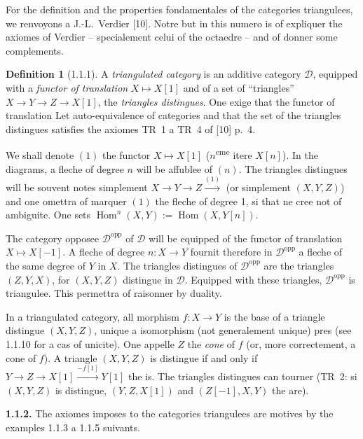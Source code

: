 \documentclass[12pt,a4paper]{article}
\theoremstyle{plain}
\theoremstyle{definition}
\newtheorem{definition}[theorem]{Definition}
\theoremstyle{remark}
\DeclareMathOperator{\Hom}{Hom}
\newcommand{\cD}{\mathcal{D}}
\begin{document}
For the definition and the properties fondamentales of the categories triangulees, we renvoyons a J.-L.~Verdier [10]. Notre but in this numero is of expliquer the axiomes of Verdier -- specialement celui of the octaedre -- and of donner some complements.

\begin{definition}[1.1.1]
A \emph{triangulated category} is an additive category $\cD$, equipped with a \emph{functor of translation} $X \longmapsto X[1]$ and of a set of ``triangles'' $X \to Y \to Z \to X[1]$, the \emph{triangles distingues}. One exige that the functor of translation Let auto-equivalence of categories and that the set of the triangles distingues satisfies the axiomes TR~1 a TR~4 of [10] p.~4.
\end{definition}

We shall denote $(1)$ the functor $X \mapsto X[1]$ ($n$\textsuperscript{eme} itere $X[n]$). In the diagrams, a fleche of degree $n$ will be affublee of $(n)$. The triangles distingues will be souvent notes simplement $X \to Y \to Z \xrightarrow{(1)}$ (or simplement $(X, Y, Z)$) and one omettra of marquer $(1)$ the fleche of degree 1, si that ne cree not of ambiguite. One sets $\Hom^{n}(X, Y) := \Hom(X, Y[n])$.

The category opposee $\cD^{\mathrm{opp}}$ of $\cD$ will be equipped of the functor of translation $X \mapsto X[-1]$. A fleche of degree $n : X \to Y$ fournit therefore in $\cD^{\mathrm{opp}}$ a fleche of the same degree of $Y$ in $X$. The triangles distingues of $\cD^{\mathrm{opp}}$ are the triangles $(Z, Y, X)$, for $(X, Y, Z)$ distingue in $\cD$. Equipped with these triangles, $\cD^{\mathrm{opp}}$ is triangulee. This permettra of raisonner by duality.

In a triangulated category, all morphism $f : X \to Y$ is the base of a triangle distingue $(X, Y, Z)$, unique a isomorphism (not generalement unique) pres (see 1.1.10 for a cas of unicite). One appelle $Z$ the \emph{cone} of $f$ (or, more correctement, a cone of $f$). A triangle $(X, Y, Z)$ is distingue if and only if $Y \to Z \to X[1] \xrightarrow{-f[1]} Y[1]$ the is. The triangles distingues can tourner (TR~2: si $(X, Y, Z)$ is distingue, $(Y, Z, X[1])$ and $(Z[-1], X, Y)$ the are).

\medskip

\noindent
\textbf{1.1.2.} The axiomes imposes to the categories triangulees are motives by the examples 1.1.3 a 1.1.5 suivants.

\medskip
\end{document}
